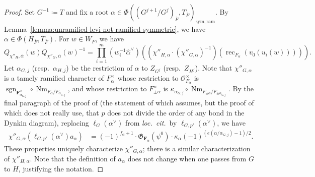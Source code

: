 \documentclass[reqno]{amsart}
\numberwithin{equation}{subsection}
\newcommand{\F}{\mathbf{F}}
\newcommand{\sgn}{\operatorname{sgn}}
\newcommand{\ol}[1]{\overline{#1}}
\newcommand{\wh}[1]{\widehat{#1}}
\newcommand\cO{\mathcal{O}}
\newcommand\frG{\mathfrak{G}}
\DeclareMathOperator{\Nm}{Nm}
\DeclareMathOperator{\rec}{rec}
\theoremstyle{remark}
\numberwithin{equation}{subsection}
\numberwithin{figure}{subsection}
\begin{document}
\begin{proof}
Set $G^{-1} \coloneqq T$ and fix a root $\alpha \in \Phi((G^{j+1}/G^j)_{\ol F}, T_{\ol F})_{\mathrm{sym,ram}}$. By Lemma~\ref{lemma:unramified-levi-not-ramified-symmetric}, we have $\alpha \in \Phi(H_{\ol F}, T_{\ol F})$. For $w \in W_F$, we have
\[
Q_{\chi''_H,\ol\alpha}(w)Q_{\chi''_G,\ol\alpha}(w)^{-1} = \prod_{i=1}^m (w_i^{-1}\wh\alpha^\vee)((\chi''_{H,\alpha} \cdot (\chi''_{G,\alpha})^{-1})(\rec_{F_\alpha}(v_0(u_i(w))))).
\]
Let $\alpha_{G,j}$ (resp.\ $\alpha_{H,j}$) be the restriction of $\alpha$ to $Z_{G^j}$ (resp.\ $Z_{H^j}$). Note that $\chi''_{G,\alpha}$ is a tamely ramified character of $F_\alpha^\times$ whose restriction to $\cO_{F_\alpha}^\times$ is $\sgn_{\F_{\alpha_{G,j}}^\times}\circ \Nm_{F_\alpha/F_{\alpha_{G,j}}}$, and whose restriction to $F_{\pm\alpha}^\times$ is $\kappa_{\alpha_{G,j}} \circ \Nm_{F_{\pm\alpha}/F_{\pm\alpha_{G,j}}}$. By the final paragraph of the proof of \cite[Lemma 4.2.7]{FKS23} (the statement of which assumes, but the proof of which does not really use, that $p$ does not divide the order of any bond in the Dynkin diagram), replacing $\ell_G(\alpha^\vee)$ from \textit{loc.\ cit.}\ by $\ell_{G,p'}(\alpha^\vee)$, we have %
\begin{align}
    \chi''_{G,\alpha}(\ell_{G,p'}(\alpha^\vee)a_\alpha) %
        &= (-1)^{f_\alpha+1} \cdot \frG_{\F_\alpha}(\psi^0) \cdot \kappa_\alpha(-1)^{(e(\alpha/\alpha_{G,j})-1)/2}.\label{eqn:chi-double-prime-G-root-value}
\end{align}
These properties uniquely characterize $\chi''_{G,\alpha}$; there is a similar characterization of $\chi''_{H,\alpha}$. Note that the definition of $a_\alpha$ does not change when one passes from $G$ to $H$, justifying the notation.


\end{proof}
\end{document}
